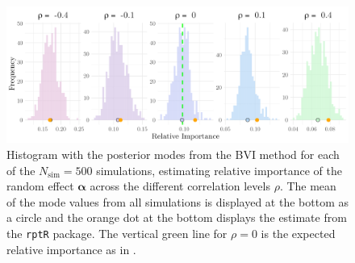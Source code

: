 \begin{figure}[ht]
  \centering
    \includegraphics[width=1\linewidth]{Figures/Simulation study/Random_logit.png}
    \caption[Relative importance of the random effect $\boldsymbol{\alpha}$ in binomial GLMM]{Histogram with the posterior modes from the BVI method for each of the $N_{\text{sim}}=500$ simulations, estimating relative importance of the random effect $\boldsymbol{\alpha}$ across the different correlation levels $\rho$. The mean of the mode values from all simulations is displayed at the bottom as a circle and the orange dot at the bottom displays the estimate from the \texttt{rptR} package. The vertical green line for $\rho=0$ is the expected relative importance as in .}
    \label{fig:relimp_random_logit}
\end{figure}

